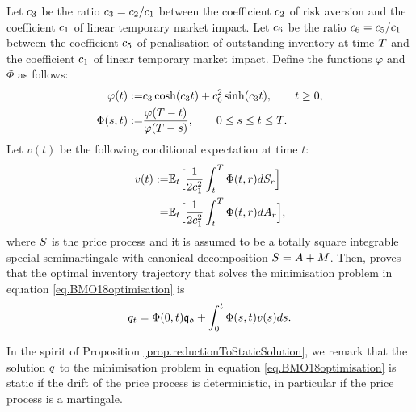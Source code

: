 \documentclass[10pt,a4paper]{article}
\begin{document}
Let $c_{3}$ be the ratio $c_{3}=c_{2}/c_{1}$ between the coefficient $c_{2}$ of risk aversion and the coefficient $c_{1}$ of linear temporary market impact. Let $c_{6}$ be the ratio $c_{6}=c_{5}/c_{1}$ between the coefficient $c_{5}$ of penalisation of outstanding inventory at time $T$  and the coefficient $c_{1}$ of linear temporary market impact. Define the functions $\varphi$ and $\Phi$ as follows:
\begin{equation}\label{eq.timeFunctionsInBMO18solution}
\begin{split}
\varphi(t) :=& c_{3} \cosh (c_{3} t) + c_{6}^{2}  \sinh(c_{3} t), \qquad t\geq 0, \\
\Phi(s,t) : = & \frac{\varphi(T - t)}{\varphi(T - s)} , \qquad 0\leq s \leq t \leq T.
\end{split}
\end{equation}
Let $v(t)$ be the following conditional expectation at time $t$:
\begin{equation}
\label{eq.conditionalExpectationInBMO18solution}
\begin{split}
v(t) :=& \mathbb{{E}}_t \Big[\frac{1}{2c_{1}^{2}}\int_{t}^{T} \Phi(t,r)dS_r \Big] \\
= & \mathbb{{E}}_t \Big[\frac{1}{2c_{1}^{2}}\int_{t}^{T} \Phi(t,r)dA_r \Big],
\end{split}
\end{equation}
where $S$ is the price process and it is assumed to be a totally square integrable special semimartingale with canonical decomposition $S = A + M$. 
Then, \cite[Theorem 3.1]{BMO18opt} proves that the optimal inventory trajectory that solves the minimisation problem in equation \eqref{eq.BMO18optimisation} is 
\begin{equation}
\label{eq.BMO18solution}
q_t = \Phi(0,t)\mathfrak{q_0} + \int_{0}^{t} \Phi(s,t)v(s) ds.
\end{equation}

\begin{remark}
In the spirit of Proposition \ref{prop.reductionToStaticSolution}, we remark that the solution $q$ to the minimisation problem in equation \eqref{eq.BMO18optimisation} is static if the drift of the price process is deterministic, in particular if the price process is a martingale. 
\end{remark}
\end{document}
